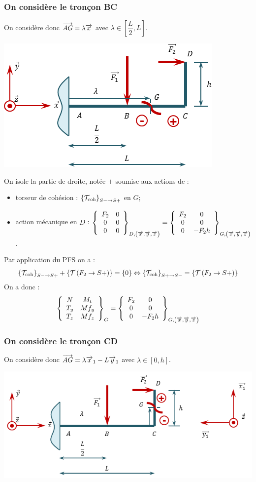 \documentclass[10pt,fleqn]{article} %
\begin{document}
\begin{multicols}{2}
\begin{corrige}
\subsubsection*{On considère le tronçon BC}
On considère donc $\vect{AG} = \lambda \vect{x}$ avec $\lambda\in \left[\dfrac{L}{2},L\right]$.
\begin{center}
\includegraphics[width=.45\textwidth]{images/exo_08_corr_02}
\end{center}


On isole la partie de droite, notée $+$ soumise aux actions de :
\begin{itemize}[label=,font=\color{ocre}] 
\item torseur de cohésion : $\torseurscoh_{S-\rightarrow S+}$ en $G$;
\item action mécanique en $D$ : $\torseurcol{F_2}{0}{0}{0}{0}{0}{D,\left( \vect{x},\vect{y},\vect{z} \right)}  =\torseurcol{F_2}{0}{0}{0}{0}{-F_2h}{G,\left( \vect{x},\vect{y},\vect{z} \right)} $.
\end{itemize}


Par application du PFS on a : 
$$ \torseurscoh_{S-\rightarrow S+} +\torseurstat{T}{F_2}{S+} = \{0\} \Leftrightarrow \torseurscoh_{S+\rightarrow S-} =\torseurstat{T}{F_2}{S+}  $$
On a donc  :
$$
\torseurcol{N}{T_y}{T_z}{M_t}{Mf_y}{Mf_z}{G} = 
\torseurcol{F_2}{0}{0}{0}{0}{-F_2h}{G,\left( \vect{x},\vect{y},\vect{z} \right)}
$$
\subsubsection*{On considère le tronçon CD}
On considère donc $\vect{AG} = \lambda \vect{x}_1-L \vect{y}_1$  avec $\lambda\in \left[0,h\right]$.
\begin{center}
\includegraphics[width=.45\textwidth]{images/exo_08_corr_03}
\end{center}



\end{corrige}
\end{multicols}
\end{document}
